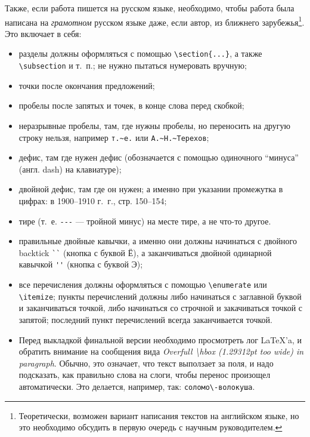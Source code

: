 Также, если работа пишется на русском языке, необходимо, чтобы работа была написана на \textit{грамотном} русском языке даже, если автор, из ближнего зарубежья\footnote{ 
Теоретически, возможен вариант написания текстов на английском языке, но это необходимо обсудить в первую очередь с научным руководителем.}.
Это включает в себя:
\begin{itemize}
  \item разделы должны оформляться с помощью \verb=\section{...}=, а также \verb=\subsection= и т.~п.; не нужно пытаться нумеровать вручную;
  \item точки после окончания предложений;
  \item пробелы после запятых  и точек, в конце слова перед скобкой;
  \item неразрывные пробелы, там, где нужны пробелы, но переносить на другую строку нельзя, например \verb=т.~е.= или \verb=А.~Н.~Терехов=;
  \item дефис, там где нужен дефис (обозначается с помощью одиночного ``минуса'' (англ. dash) на клавиатуре);
  \item двойной дефис, там где он нужен; а именно  при указании проме\-жутка в цифрах: в 1900--1910 г.~г., стр. 150--154;
  \item тире (т.~е. \verb=---= --- тройной минус) на месте тире, а не что-то другое.
  \item правильные двойные кавычки, а именно они должны начинаться с двойного backtick \verb=``= (кнопка с буквой Ё), а заканчиваться двойной одинарной кавычкой \verb=''= (кнопка с буквой Э);
  \item все перечисления должны оформляться с помощью \verb=\enumerate= или \verb=\itemize=; пункты перечислений должны либо начинаться с заглавной буквой и заканчиваться точкой, либо начинаться со строчной и закачиваться точкой с запятой; последний пункт пере\-числений всегда заканчивается точкой.
  \item Перед выкладкой финальной версии необходимо просмотреть лог \LaTeX'a, и обратить внимание на сообщения вида \emph{Overfull \textbackslash hbox (1.29312pt too wide) in paragraph}. Обычно, это означает, что текст выползает за поля, и надо подсказать, как правильно слова на слоги, чтобы перенос произощел автоматически. Это делается, например, так: \verb=соломо\-волокуша=.
\end{itemize}



